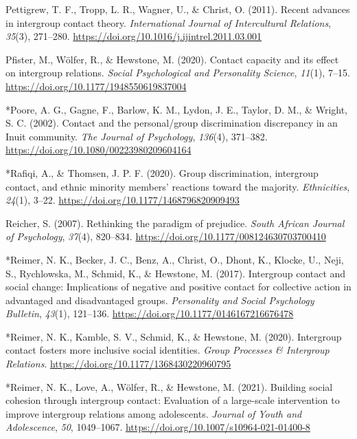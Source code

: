\documentclass[12pt, letterpaper]{article}
\begin{document}
\leavevmode\hypertarget{ref-pettigrew_recent_2011}{}%
Pettigrew, T. F., Tropp, L. R., Wagner, U., \& Christ, O. (2011). Recent
advances in intergroup contact theory. \emph{International Journal of
Intercultural Relations}, \emph{35}(3), 271--280.
\url{https://doi.org/10.1016/j.ijintrel.2011.03.001}

\leavevmode\hypertarget{ref-pfister_contact_2020}{}%
Pfister, M., Wölfer, R., \& Hewstone, M. (2020). Contact capacity and
its effect on intergroup relations. \emph{Social Psychological and
Personality Science}, \emph{11}(1), 7--15.
\url{https://doi.org/10.1177/1948550619837004}

\leavevmode\hypertarget{ref-1762}{}%
*Poore, A. G., Gagne, F., Barlow, K. M., Lydon, J. E., Taylor, D. M., \&
Wright, S. C. (2002). Contact and the personal/group discrimination
discrepancy in an Inuit community. \emph{The Journal of Psychology},
\emph{136}(4), 371--382. \url{https://doi.org/10.1080/00223980209604164}

\leavevmode\hypertarget{ref-3051}{}%
*Rafiqi, A., \& Thomsen, J. P. F. (2020). Group discrimination,
intergroup contact, and ethnic minority members' reactions toward the
majority. \emph{Ethnicities}, \emph{24}(1), 3--22.
\url{https://doi.org/10.1177/1468796820909493}

\leavevmode\hypertarget{ref-reicher_rethinking_2007}{}%
Reicher, S. (2007). Rethinking the paradigm of prejudice. \emph{South
African Journal of Psychology}, \emph{37}(4), 820--834.
\url{https://doi.org/10.1177/008124630703700410}

\leavevmode\hypertarget{ref-956}{}%
*Reimer, N. K., Becker, J. C., Benz, A., Christ, O., Dhont, K., Klocke,
U., Neji, S., Rychlowska, M., Schmid, K., \& Hewstone, M. (2017).
Intergroup contact and social change: Implications of negative and
positive contact for collective action in advantaged and disadvantaged
groups. \emph{Personality and Social Psychology Bulletin}, \emph{43}(1),
121--136. \url{https://doi.org/10.1177/0146167216676478}

\leavevmode\hypertarget{ref-2380}{}%
*Reimer, N. K., Kamble, S. V., Schmid, K., \& Hewstone, M. (2020).
Intergroup contact fosters more inclusive social identities. \emph{Group
Processes \& Intergroup Relations}.
\url{https://doi.org/10.1177/1368430220960795}

\leavevmode\hypertarget{ref-2399}{}%
*Reimer, N. K., Love, A., Wölfer, R., \& Hewstone, M. (2021). Building
social cohesion through intergroup contact: Evaluation of a large-scale
intervention to improve intergroup relations among adolescents.
\emph{Journal of Youth and Adolescence}, \emph{50}, 1049--1067.
\url{https://doi.org/10.1007/s10964-021-01400-8}
\end{document}
